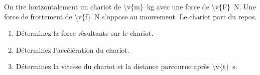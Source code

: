 On tire horizontalement un chariot de \qty{\v{m}}{kg} avec une force de \qty{\v{F}}{N}. Une force de frottement de \qty{\v{f}}{N} s'oppose au mouvement. Le chariot part du repos.

\begin{enumerate}[label=\alph*)]
    \item Déterminez la force résultante sur le chariot.
    \item Déterminez l'accélération du chariot.
    \item Déterminez la vitesse du chariot et la distance parcourue après \qty{\v{t}}{s}.
\end{enumerate}
